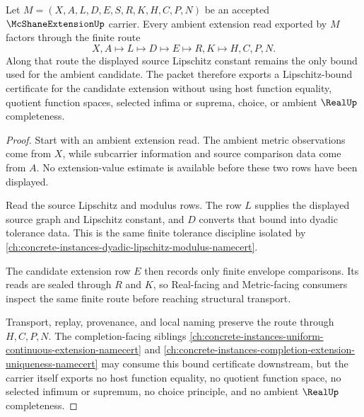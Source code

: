 \begin{theorem}
\label{thm:mcshane-extension-lipschitz-bound}
Let $M=(X,A,L,D,E,S,R,K,H,C,P,N)$ be an accepted $\McShaneExtensionUp$ carrier. Every ambient extension read exported by $M$ factors through the finite route
$$
X,A\longmapsto L\longmapsto D\longmapsto E\longmapsto R,K\longmapsto H,C,P,N .
$$
Along that route the displayed source Lipschitz constant remains the only bound used for the ambient candidate. The packet therefore exports a Lipschitz-bound certificate for the candidate extension without using host function equality, quotient function spaces, selected infima or suprema, choice, or ambient $\RealUp$ completeness.
\end{theorem}
\begin{proof}
Start with an ambient extension read. The ambient metric observations come from $X$, while subcarrier information and source comparison data come from $A$. No extension-value estimate is available before these two rows have been displayed.

Read the source Lipschitz and modulus rows. The row $L$ supplies the displayed source graph and Lipschitz constant, and $D$ converts that bound into dyadic tolerance data. This is the same finite tolerance discipline isolated by \autoref{ch:concrete-instances-dyadic-lipschitz-modulus-namecert}.

The candidate extension row $E$ then records only finite envelope comparisons. Its reads are sealed through $R$ and $K$, so Real-facing and Metric-facing consumers inspect the same finite route before reaching structural transport.

Transport, replay, provenance, and local naming preserve the route through $H,C,P,N$. The completion-facing siblings \autoref{ch:concrete-instances-uniform-continuous-extension-namecert} and \autoref{ch:concrete-instances-completion-extension-uniqueness-namecert} may consume this bound certificate downstream, but the carrier itself exports no host function equality, no quotient function space, no selected infimum or supremum, no choice principle, and no ambient $\RealUp$ completeness.
\end{proof}

